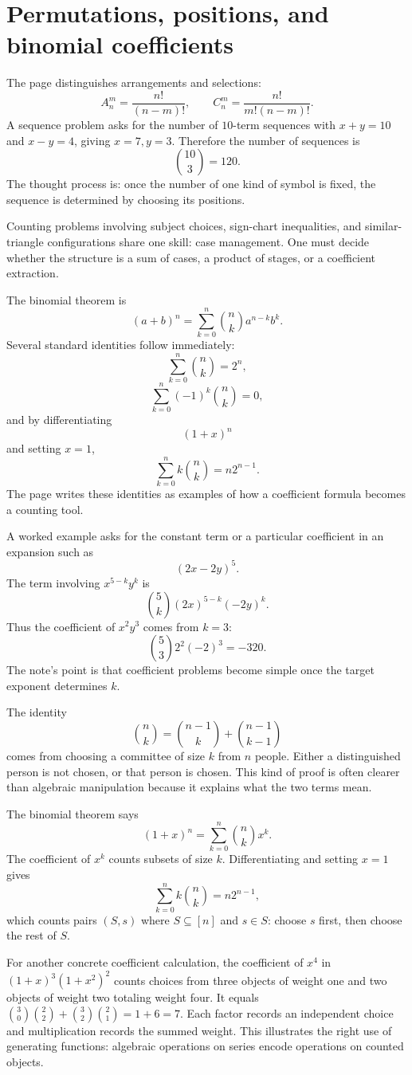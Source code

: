 \section{Permutations, positions, and binomial coefficients}

The page distinguishes arrangements and selections:
\[
  A_n^m=\frac{n!}{(n-m)!},\qquad
  C_n^m=\frac{n!}{m!(n-m)!}.
\]
A sequence problem asks for the number of \(10\)-term sequences with \(x+y=10\) and \(x-y=4\), giving \(x=7,y=3\).  Therefore the number of sequences is
\[
  \binom{10}{3}=120.
\]
The thought process is: once the number of one kind of symbol is fixed, the sequence is determined by choosing its positions.

Counting problems involving subject choices, sign-chart inequalities, and similar-triangle configurations share one skill: case management.  One must decide whether the structure is a sum of cases, a product of stages, or a coefficient extraction.

The binomial theorem is
\[
  (a+b)^n=\sum_{k=0}^n\binom nk a^{n-k}b^k.
\]
Several standard identities follow immediately:
\[
  \sum_{k=0}^n\binom nk=2^n,
\]
\[
  \sum_{k=0}^n(-1)^k\binom nk=0,
\]
and by differentiating
\[
  (1+x)^n
\]
and setting \(x=1\),
\[
  \sum_{k=0}^n k\binom nk=n2^{n-1}.
\]
The page writes these identities as examples of how a coefficient formula becomes a counting tool.

A worked example asks for the constant term or a particular coefficient in an expansion such as
\[
  (2x-2y)^5.
\]
The term involving \(x^{5-k}y^k\) is
\[
  \binom5k(2x)^{5-k}(-2y)^k.
\]
Thus the coefficient of \(x^2y^3\) comes from \(k=3\):
\[
  \binom53 2^2(-2)^3=-320.
\]
The note's point is that coefficient problems become simple once the target exponent determines \(k\).

The identity
\[
  \binom n k=\binom{n-1}k+\binom{n-1}{k-1}
\]
comes from choosing a committee of size \(k\) from \(n\) people.  Either a distinguished person is not chosen, or that person is chosen.  This kind of proof is often clearer than algebraic manipulation because it explains what the two terms mean.

The binomial theorem says
\[
  (1+x)^n=\sum_{k=0}^n\binom nkx^k.
\]
The coefficient of \(x^k\) counts subsets of size \(k\).  Differentiating and setting \(x=1\) gives
\[
  \sum_{k=0}^n k\binom nk=n2^{n-1},
\]
which counts pairs \((S,s)\) where \(S\subseteq[n]\) and \(s\in S\): choose \(s\) first, then choose the rest of \(S\).

For another concrete coefficient calculation, the coefficient of \(x^4\) in \((1+x)^3(1+x^2)^2\) counts choices from three objects of weight one and two objects of weight two totaling weight four. It equals \(\binom30\binom22+\binom32\binom21=1+6=7\). Each factor records an independent choice and multiplication records the summed weight. This illustrates the right use of generating functions: algebraic operations on series encode operations on counted objects.

